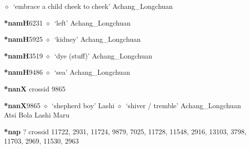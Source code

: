 \begin{list}{}{\leftmargin=1.5em \itemindent=-1.5em}
\hspace{1ex}
         $\diamond$~`embrace a child cheek to cheek'
         Achang\_Longchuan 
  \item {\footnotesize \textbf{*namH}}{\tiny 6231}
\hspace{1ex}
         $\diamond$~`left'
         Achang\_Longchuan 
  \item {\footnotesize \textbf{*namH}}{\tiny 5925}
\hspace{1ex}
         $\diamond$~`kidney'
         Achang\_Longchuan 
  \item {\footnotesize \textbf{*namH}}{\tiny 3519}
\hspace{1ex}
         $\diamond$~`dye (stuff)'
         Achang\_Longchuan 
  \item {\footnotesize \textbf{*namH}}{\tiny 9486}
\hspace{1ex}
         $\diamond$~`sea'
         Achang\_Longchuan 
  \end{list}
\item
\textbf{*nanX}
  {\tiny crossid 9865}
  \begin{list}{}{\leftmargin=1.5em \itemindent=-1.5em}
  \item {\footnotesize \textbf{*nanX}}{\tiny 9865}
         $\diamond$~`shepherd boy'
         Lashi 
\hspace{1ex}
         $\diamond$~`shiver / tremble'
         Achang\_Longchuan 
\hspace{1ex}
         Atsi 
\hspace{1ex}
         Bola 
\hspace{1ex}
         Lashi 
\hspace{1ex}
         Maru 
  \end{list}
\item
\textbf{*nap}
?
  {\tiny crossid 11722, 2931, 11724, 9879, 7025, 11728, 11548, 2916, 13103, 3798, 11703, 2969, 11530, 2963}
